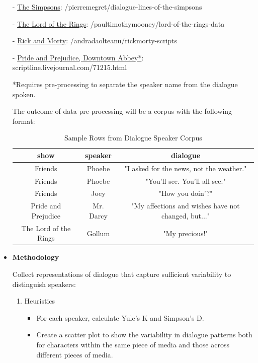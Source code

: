 \documentclass{article}
\begin{document}
\begin{titlepage}
\begin{itemize}
			- \href{https://www.kaggle.com/datasets/pierremegret/dialogue-lines-of-the-simpsons}{The Simpsons}: /pierremegret/dialogue-lines-of-the-simpsons
			
			- \href{https://www.kaggle.com/datasets/paultimothymooney/lord-of-the-rings-data?select=lotr_scripts.csv}{The Lord of the Rings}: /paultimothymooney/lord-of-the-rings-data
			
			- \href{https://www.kaggle.com/datasets/andradaolteanu/rickmorty-scripts}{Rick and Morty}: /andradaolteanu/rickmorty-scripts

			- \href{https://scriptline.livejournal.com/71215.html#cutid6}{Pride and Prejudice, Downtown Abbey*}: scriptline.livejournal.com/71215.html
			 
			*Requires pre-processing to separate the speaker name from the dialogue spoken.

			The outcome of data pre-processing will be a corpus with the following format:
			
			\begin{table}[H]
				\centering
				\begin{tabular}{|c|c|c|}
					\hline
					\textbf{} \textbf{show} & \textbf{speaker} & \textbf{dialogue} \\
					\hline
					Friends & Phoebe &  "I asked for the news, not the weather." \\
					Friends & Phoebe &  "You'll see. You'll all see." \\
					Friends & Joey &  "How you doin'?" \\
					Pride and Prejudice & Mr. Darcy &  "My affections and wishes have not changed, but..."  \\
					The Lord of the Rings & Gollum &  "My precious!" \\
					\hline
				\end{tabular}
				\caption{Sample Rows from Dialogue Speaker Corpus}
				\label{tab:images}
			\end{table}

        \item[] \textbf{Methodology}
            
		Collect representations of dialogue that capture sufficient variability to distinguish speakers:
		
		\begin{enumerate}
			\item Heuristics
			\begin{itemize}
				\item For each speaker, calculate Yule's K and Simpson's D.
				\item Create a scatter plot to show the variability in dialogue patterns both for characters within the same piece of media and those across different pieces of media.
			\end{itemize}
		

\end{enumerate}
\end{itemize}
\end{titlepage}
\end{document}
